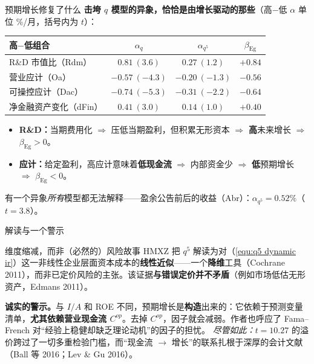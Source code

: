 \documentclass{beamer}
\begin{document}
\begin{frame}{预期增长修复了什么}
	\textbf{击垮 $q$ 模型的异象，恰恰是由增长驱动的那些}（高$-$低 $\alpha$ 单位 \%/月，括号内为 $t$）：
	\begin{center}
		\small
		\begin{tabular}{@{}lccc@{}}
			\toprule
			高$-$低组合 & $\alpha_q$ & $\alpha_{q^5}$ & $\beta_{\text{Eg}}$ \\
			\midrule
			R\&D 市值比（Rdm）       & $0.81\ (3.6)$   & $0.27\ (1.2)$   & $+0.84$ \\
			营业应计（Oa）           & $-0.57\ (-4.3)$ & $-0.20\ (-1.3)$ & $-0.56$ \\
			可操控应计（Dac）        & $-0.74\ (-5.3)$ & $-0.31\ (-2.2)$ & $-0.64$ \\
			净金融资产变化（dFin）   & $0.41\ (3.0)$   & $0.14\ (1.0)$   & $+0.40$ \\
			\bottomrule
		\end{tabular}
	\end{center}
	\begin{itemize}
		\item \textbf{R\&D：}当期费用化 $\Rightarrow$ 压低当期盈利，但积累无形资本 $\Rightarrow$ \textbf{高}未来增长 $\Rightarrow$ $\beta_{\text{Eg}}>0$。
		\item \textbf{应计：}给定盈利，高应计意味着\textbf{低现金流} $\Rightarrow$ 内部资金少 $\Rightarrow$ \textbf{低}预期增长 $\Rightarrow$ $\beta_{\text{Eg}}<0$。
	\end{itemize}
	{\footnotesize 有一个异象\textit{所有}模型都无法解释——盈余公告前后的收益（Abr）：$\alpha_{q^5}=0.52\%$（$t=3.8$）。}
\end{frame}

\begin{frame}{解读与一个警示}
	\begin{block}{维度缩减，而非（必然的）风险故事}
		HMXZ 把 $q^5$ 解读为对（\ref{equ:q5 dynamic ir}）这一非线性企业层面资本成本的\textbf{线性近似}——一个\textbf{降维}工具（Cochrane 2011），而非已定价风险的主张。该证据\textbf{与错误定价并不矛盾}（例如市场低估无形资产，Edmans 2011）。
	\end{block}
	\textbf{诚实的警示。}与 $I/A$ 和 ROE 不同，预期增长是\textbf{构造}出来的：它依赖于预测变量清单，\textbf{尤其依赖营业现金流 $C^{op}$}。去掉 $C^{op}$，因子就会减弱。作者也呼应了 Fama--French 对“经验上稳健却缺乏理论动机”的因子的担忧。
	\vspace{2pt}
	\textit{尽管如此：}$t=10.27$ 的溢价跨过了一切多重检验门槛，而“现金流 $\to$ 增长”的联系扎根于深厚的会计文献（Ball 等 2016；Lev \& Gu 2016）。
\end{frame}
\end{document}
